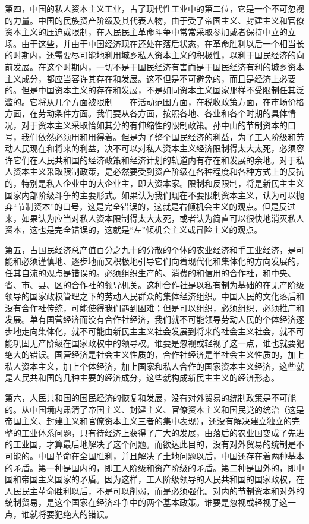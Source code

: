 \documentclass[UTF-8, a5paper, 12pt]{ctexart}
\begin{document}
第四，中国的私人资本主义工业，占了现代性工业中的第二位，它是一个不可忽视的力量。中国的民族资产阶级及其代表人物，由于受了帝国主义、封建主义和官僚资本主义的压迫或限制，在人民民主革命斗争中常常采取参加或者保持中立的立场。由于这些，并由于中国经济现在还处在落后状态，在革命胜利以后一个相当长的时期内，还需要尽可能地利用城乡私人资本主义的积极性，以利于国民经济的向前发展。在这个时期内，一切不是于国民经济有害而是于国民经济有利的城乡资本主义成分，都应当容许其存在和发展。这不但是不可避免的，而且是经济上必要的。但是中国资本主义的存在和发展，不是如同资本主义国家那样不受限制任其泛滥的。它将从几个方面被限制——在活动范围方面，在税收政策方面，在市场价格方面，在劳动条件方面。我们要从各方面，按照各地、各业和各个时期的具体情况，对于资本主义采取恰如其分的有伸缩性的限制政策。孙中山的节制资本的口号，我们依然必须用和用得着。但是为了整个国民经济的利益，为了工人阶级和劳动人民现在和将来的利益，决不可以对私人资本主义经济限制得太大太死，必须容许它们在人民共和国的经济政策和经济计划的轨道内有存在和发展的余地。对于私人资本主义采取限制政策，是必然要受到资产阶级在各种程度和各种方式上的反抗的，特别是私人企业中的大企业主，即大资本家。限制和反限制，将是新民主主义国家内部阶级斗争的主要形式。如果认为我们现在不要限制资本主义，认为可以抛弃“节制资本”的口号，这是完全错误的，这就是右倾机会主义的观点。但是反过来，如果认为应当对私人资本限制得太大太死，或者认为简直可以很快地消灭私人资本，这也是完全错误的，这就是“左”倾机会主义或冒险主义的观点。

第五，占国民经济总产值百分之九十的分散的个体的农业经济和手工业经济，是可能和必须谨慎地、逐步地而又积极地引导它们向着现代化和集体化的方向发展的，任其自流的观点是错误的。必须组织生产的、消费的和信用的合作社，和中央、省、市、县、区的合作社的领导机关。这种合作社是以私有制为基础的在无产阶级领导的国家政权管理之下的劳动人民群众的集体经济组织。中国人民的文化落后和没有合作社传统，可能使得我们遇到困难；但是可以组织，必须组织，必须推广和发展。单有国营经济而没有合作社经济，我们就不可能领导劳动人民的个体经济逐步地走向集体化，就不可能由新民主主义社会发展到将来的社会主义社会，就不可能巩固无产阶级在国家政权中的领导权。谁要是忽视或轻视了这一点，谁也就要犯绝大的错误。国营经济是社会主义性质的，合作社经济是半社会主义性质的，加上私人资本主义，加上个体经济，加上国家和私人合作的国家资本主义经济，这些就是人民共和国的几种主要的经济成分，这些就构成新民主主义的经济形态。

第六，人民共和国的国民经济的恢复和发展，没有对外贸易的统制政策是不可能的。从中国境内肃清了帝国主义、封建主义、官僚资本主义和国民党的统治（这是帝国主义、封建主义和官僚资本主义三者的集中表现），还没有解决建立独立的完整的工业体系问题，只有待经济上获得了广大的发展，由落后的农业国变成了先进的工业国，才算最后地解决了这个问题。而欲达此目的，没有对外贸易的统制是不可能的。中国革命在全国胜利，并且解决了土地问题以后，中国还存在着两种基本的矛盾。第一种是国内的，即工人阶级和资产阶级的矛盾。第二种是国外的，即中国和帝国主义国家的矛盾。因为这样，工人阶级领导的人民共和国的国家政权，在人民民主革命胜利以后，不是可以削弱，而是必须强化。对内的节制资本和对外的统制贸易，是这个国家在经济斗争中的两个基本政策。谁要是忽视或轻视了这一点，谁就将要犯绝大的错误。
\end{document}
